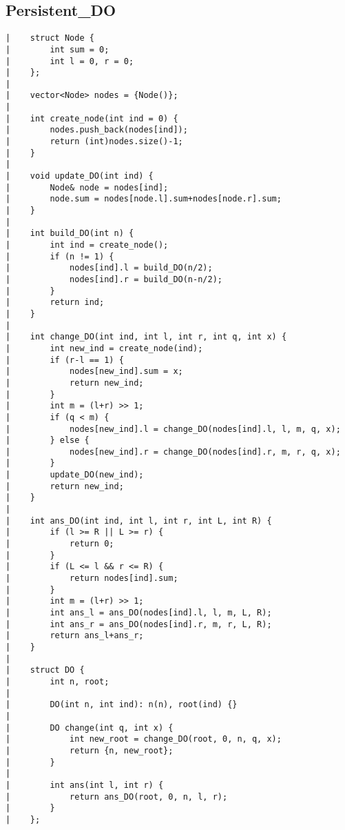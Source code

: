 \documentclass[a4paper, 10pt]{article}
\begin{document}
\begin{center}
\section*{Persistent\_DO}
\begin{verbatim}
|    struct Node {
|        int sum = 0;
|        int l = 0, r = 0;
|    };
|    
|    vector<Node> nodes = {Node()};
|    
|    int create_node(int ind = 0) {
|        nodes.push_back(nodes[ind]);
|        return (int)nodes.size()-1;
|    }
|    
|    void update_DO(int ind) {
|        Node& node = nodes[ind];
|        node.sum = nodes[node.l].sum+nodes[node.r].sum;
|    }
|    
|    int build_DO(int n) {
|        int ind = create_node();
|        if (n != 1) {
|            nodes[ind].l = build_DO(n/2);
|            nodes[ind].r = build_DO(n-n/2);
|        }
|        return ind;
|    }
|    
|    int change_DO(int ind, int l, int r, int q, int x) {
|        int new_ind = create_node(ind);
|        if (r-l == 1) {
|            nodes[new_ind].sum = x;
|            return new_ind;
|        }
|        int m = (l+r) >> 1;
|        if (q < m) {
|            nodes[new_ind].l = change_DO(nodes[ind].l, l, m, q, x);
|        } else {
|            nodes[new_ind].r = change_DO(nodes[ind].r, m, r, q, x);
|        }
|        update_DO(new_ind);
|        return new_ind;
|    }
|    
|    int ans_DO(int ind, int l, int r, int L, int R) {
|        if (l >= R || L >= r) {
|            return 0;
|        }
|        if (L <= l && r <= R) {
|            return nodes[ind].sum;
|        }
|        int m = (l+r) >> 1;
|        int ans_l = ans_DO(nodes[ind].l, l, m, L, R);
|        int ans_r = ans_DO(nodes[ind].r, m, r, L, R);
|        return ans_l+ans_r;
|    }
|    
|    struct DO {
|        int n, root;
|    
|        DO(int n, int ind): n(n), root(ind) {}
|    
|        DO change(int q, int x) {
|            int new_root = change_DO(root, 0, n, q, x);
|            return {n, new_root};
|        }
|    
|        int ans(int l, int r) {
|            return ans_DO(root, 0, n, l, r);
|        }
|    };
\end{verbatim}


\end{center}
\end{document}
